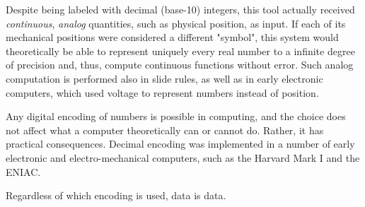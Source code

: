 \begin{tcolorbox}[breakable, enhanced, colback=textbook-blue, sharp corners]
	Despite being labeled with decimal (base-10) integers, this tool actually received \textit{continuous}, \textit{analog} quantities, such as physical position, as input. If each of its mechanical positions were considered a different "symbol", this system would theoretically be able to represent uniquely every real number to a infinite degree of precision and, thus, compute continuous functions without error. Such analog computation is performed also in slide rules, as well as in early electronic computers, which used voltage to represent numbers instead of position. \\
	
	\begin{center}
	\end{center}
	
	
	Any digital encoding of numbers is possible in computing, and the choice does not affect what a computer theoretically can or cannot do. Rather, it has practical consequences. Decimal encoding was implemented in a number of early electronic and electro-mechanical computers, such as the Harvard Mark I and the ENIAC. 
	
	
	
	\vspace{1mm}
\end{tcolorbox}
\vspace{7mm}



Regardless of which encoding is used, data is data.

